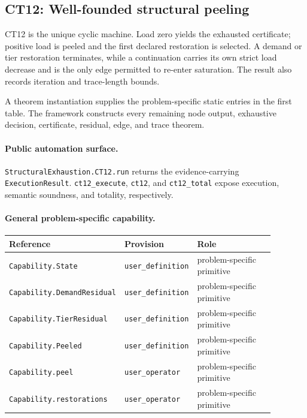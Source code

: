\subsection{CT12: Well-founded structural peeling}
\label{sec:ct12-automation}

CT12 is the unique cyclic machine. Load zero yields the exhausted certificate; positive load is peeled and the first declared restoration is selected. A demand or tier restoration terminates, while a continuation carries its own strict load decrease and is the only edge permitted to re-enter saturation. The result also records iteration and trace-length bounds.

A theorem instantiation supplies the problem-specific static entries in the first table. The framework constructs every remaining node output, exhaustive decision, certificate, residual, edge, and trace theorem.

\paragraph{Public automation surface.}
\texttt{StructuralExhaustion.CT12.run} returns the evidence-carrying \texttt{ExecutionResult}. \texttt{ct12\_\allowbreak{}execute}, \texttt{ct12}, and \texttt{ct12\_\allowbreak{}total} expose execution, semantic soundness, and totality, respectively.

\paragraph{General problem-specific capability.}
\begingroup\small
\begin{longtable}{@{}p{0.27\linewidth}p{0.15\linewidth}p{0.46\linewidth}@{}}
\toprule
Reference & Provision & Role \\
\midrule
\endhead
\texttt{Capability.\allowbreak{}State} & \texttt{user\_\allowbreak{}definition} & problem-specific primitive \\
\texttt{Capability.\allowbreak{}Demand\allowbreak{}Residual} & \texttt{user\_\allowbreak{}definition} & problem-specific primitive \\
\texttt{Capability.\allowbreak{}Tier\allowbreak{}Residual} & \texttt{user\_\allowbreak{}definition} & problem-specific primitive \\
\texttt{Capability.\allowbreak{}Peeled} & \texttt{user\_\allowbreak{}definition} & problem-specific primitive \\
\texttt{Capability.\allowbreak{}peel} & \texttt{user\_\allowbreak{}operator} & problem-specific primitive \\
\texttt{Capability.\allowbreak{}restorations} & \texttt{user\_\allowbreak{}operator} & problem-specific primitive \\
\bottomrule
\end{longtable}
\endgroup


